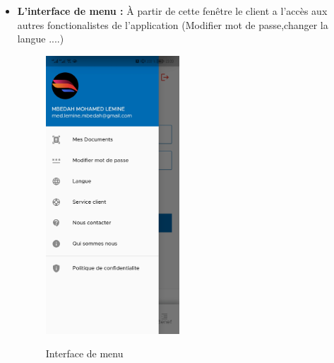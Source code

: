 \begin{itemize}[label=$\ast$]
\newpage
\item \textbf{L’interface de menu
	:} À partir de cette fenêtre le client a l'accès aux autres fonctionalistes de l'application (Modifier mot de passe,changer la langue ....)
\begin{figure}%
	\centering
	{{\includegraphics[width=5cm]{./Template LaTeX/Images/menu.jpg} }}%
	\caption{Interface de menu}%
	\label{fig:example}%
\end{figure}
\end{itemize}

